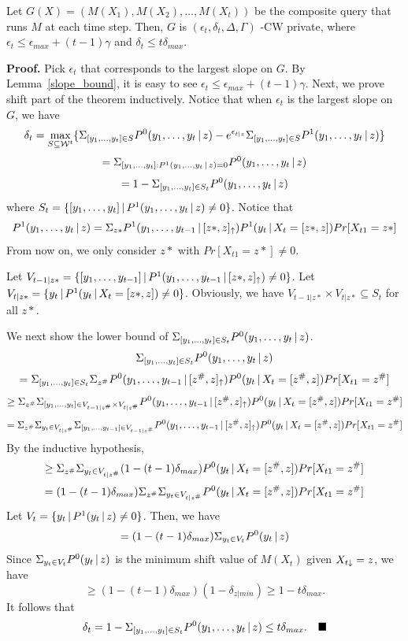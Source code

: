\documentclass[11pt]{article}
\begin{document}
\begin{theorem}
Let $G(X) = (M(X_{1}), M(X_{2}) , \dots, M(X_{t}))$ be the composite query that runs $M$ at each time step. Then, $G$ is $( \epsilon_{t},  \delta_{t}, \Delta, \Gamma)$ -CW private, where $ \epsilon_{t} \leq \epsilon_{max} + (t-1)\gamma$ and $\delta_{t} \leq t \delta_{max}$. 
\end{theorem}
{\bf Proof.} Pick $\epsilon_{t}$ that corresponds to the largest slope on $G$. By Lemma~\ref{slope_bound}, it is easy to see $\epsilon_{t} \leq \epsilon_{max} + (t-1)\gamma$. Next, we prove shift part of the theorem inductively. Notice that when $\epsilon_{t}$ is the largest slope on $G$, we have
\[
\delta_{t} = \max_{S \subseteq {\cal W}^{t}} \{\Sigma_{[y_{1}, \dots ,y_{t}]\in S} P^{0}(y_{1}, \dots , y_{t} \,|\, z) - e^{\epsilon_{t|z}}\Sigma_{[y_{1}, \dots ,y_{t}]\in S} P^{1}(y_{1}, \dots , y_{t} \,|\, z)\}
\]
\[
=\Sigma_{[y_{1}, \dots ,y_{t}]: P^{1}(y_{1}, \dots , y_{t} \,|\, z)=0} P^{0}(y_{1}, \dots , y_{t} \,|\, z)
\]
\[
=1- \Sigma_{[y_{1}, \dots ,y_{t}]\in S_{t}} P^{0}(y_{1}, \dots , y_{t} \,|\, z)
\]
where $S_{t}=\{[y_{1}, \dots ,y_{t}] \,|\, P^{1}(y_{1}, \dots , y_{t} \,|\, z)\neq 0 \}$. Notice that
\[
P^{1}(y_{1}, \dots , y_{t} \,|\, z) = \Sigma_{z*} P^{1}(y_{1}, \dots , y_{t-1} \,|\, [z*,z]_\uparrow) P^{1}(y_{t} \,|\, X_{t}=[z*,z])Pr[X_{t1}=z*]
\]
From now on, we only consider $z*$ with $Pr[X_{t1}=z*] \neq 0$.

Let $V_{t-1|z*} = \{[y_{1}, \dots ,y_{t-1}] \,|\,  P^{1}(y_{1}, \dots , y_{t-1} \,|\, [z*,z]_\uparrow) \neq 0  \}$. Let $V_{t|z*} =\{y_{t} \,|\, P^{1}(y_{t} \,|\, X_{t}=[z*,z]) \neq 0\}$. Obviously, we have $V_{t-1|z*} \times V_{t|z*} \subseteq S_{t}$ for all $z*$. 

We next show the lower bound of $\Sigma_{[y_{1}, \dots ,y_{t}]\in S_{t}} P^{0}(y_{1}, \dots , y_{t} \,|\, z) $.
\[
\Sigma_{[y_{1}, \dots ,y_{t}]\in S_{t}} P^{0}(y_{1}, \dots , y_{t} \,|\, z) 
\]
\[
= \Sigma_{[y_{1}, \dots ,y_{t}]\in S_{t}} \Sigma_{z^{\#}} P^{0}(y_{1}, \dots , y_{t-1} \,|\, [z^{\#}, z]_\uparrow) P^{0}(y_{t} \,|\, X_{t}=[z^{\#}, z]) Pr[X_{t1}=z^{\#}]
\]
\[
\geq \Sigma_{z^{\#}} \Sigma_{[y_{1}, \dots ,y_{t}] \in V_{t-1|z^{\#}} \times V_{t|z^{\#}} } P^{0}(y_{1}, \dots , y_{t-1} \,|\, [z^{\#}, z]_\uparrow) P^{0}(y_{t} \,|\, X_{t}=[z^{\#}, z]) Pr[X_{t1}=z^{\#}]
\]
\[
=\Sigma_{z^{\#}} \Sigma_{y_{t} \in V_{t|z^{\#}}}\Sigma_{[y_{1}, \dots ,y_{t-1}] \in V_{t-1|z^{\#}} } P^{0}(y_{1}, \dots , y_{t-1} \,|\, [z^{\#}, z]_\uparrow) P^{0}(y_{t} \,|\, X_{t}=[z^{\#}, z]) Pr[X_{t1}=z^{\#}]
\]
By the inductive hypothesis, 
\[
\geq \Sigma_{z^{\#}} \Sigma_{y_{t} \in V_{t|z^{\#}}}  (1- (t-1)\delta_{max}) P^{0}(y_{t} \,|\, X_{t}=[z^{\#}, z]) Pr[X_{t1}=z^{\#}]
\]
\[
= (1- (t-1)\delta_{max})  \Sigma_{z^{\#}} \Sigma_{y_{t} \in V_{t|z^{\#}}} P^{0}(y_{t} \,|\, X_{t}=[z^{\#}, z]) Pr[X_{t1}=z^{\#}]
\]
Let $V_{t}= \{y_{t} \,| \, P^{1}(y_{t} \,|\, z) \neq 0\}$. Then, we have
\[
=(1- (t-1)\delta_{max})  \Sigma_{y_{t} \in V_{t}} P^{0}(y_{t} \,|\,  z) 
\]
Since $\Sigma_{y_{t} \in V_{t}} P^{0}(y_{t} \,|\,  z) $ is the minimum shift value of $M(X_{t})$ given $X_{t \downarrow}=z$, we have
\[
\geq (1- (t-1)\delta_{max}) (1- \delta_{z|min})\geq 1 - t\delta_{max}.
\]
It follows that 
\[
\delta_{t} = 1- \Sigma_{[y_{1}, \dots ,y_{t}]\in S_{t}} P^{0}(y_{1}, \dots , y_{t} \,|\, z) \leq t\delta_{max}. \quad \blacksquare
\]
\end{document}
